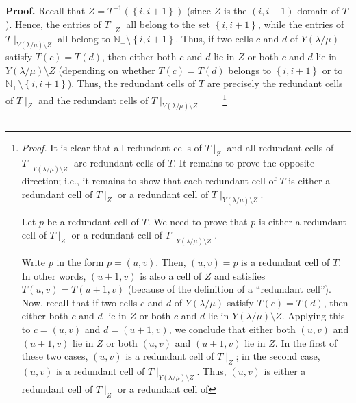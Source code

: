 \documentclass[numbers=enddot,12pt,final,onecolumn,notitlepage]{scrartcl}%
\theoremstyle{definition}
\newenvironment{proof}[1][Proof]{\noindent\textbf{#1.} }{\ \rule{0.5em}{0.5em}}
\newenvironment{verlong}{}{}
\begin{document}
\begin{verlong}
\begin{proof}
Recall that $Z=T^{-1}\left(  \left\{  i,i+1\right\}  \right)  $ (since $Z$ is
the $\left(  i,i+1\right)  $-domain of $T$). Hence, the entries of $T\mid_{Z}$
all belong to the set $\left\{  i,i+1\right\}  $, while the entries of
$T\mid_{Y\left(  \lambda/\mu\right)  \setminus Z}$ all belong to
$\mathbb{N}_{+}\setminus\left\{  i,i+1\right\}  $. Thus, if two cells $c$ and
$d$ of $Y\left(  \lambda/\mu\right)  $ satisfy $T\left(  c\right)  =T\left(
d\right)  $, then either both $c$ and $d$ lie in $Z$ or both $c$ and $d$ lie
in $Y\left(  \lambda/\mu\right)  \setminus Z$ (depending on whether $T\left(
c\right)  =T\left(  d\right)  $ belongs to $\left\{  i,i+1\right\}  $ or to
$\mathbb{N}_{+}\setminus\left\{  i,i+1\right\}  $). Thus, the redundant cells
of $T$ are precisely the redundant cells of $T\mid_{Z}$ and the redundant cells
of $T\mid_{Y\left(  \lambda/\mu\right)  \setminus Z}$%
\ \ \ \ \footnote{\textit{Proof.} It is clear that all redundant cells of
$T\mid_{Z}$ and all redundant cells of $T\mid_{Y\left(  \lambda/\mu\right)
\setminus Z}$ are redundant cells of $T$. It remains to prove the opposite
direction; i.e., it remains to show that each redundant cell of $T$ is either a
redundant cell of $T\mid_{Z}$ or a redundant cell of $T\mid_{Y\left(
\lambda/\mu\right)  \setminus Z}$.
\par
Let $p$ be a redundant cell of $T$. We need to prove that $p$ is either a
redundant cell of $T\mid_{Z}$ or a redundant cell of $T\mid_{Y\left(
\lambda/\mu\right)  \setminus Z}$.
\par
Write $p$ in the form $p=\left(  u,v\right)  $. Then, $\left(  u,v\right)  =p$
is a redundant cell of $T$. In other words, $\left(  u+1,v\right)  $ is also a
cell of $Z$ and satisfies $T\left(  u,v\right)  =T\left(  u+1,v\right)  $
(because of the definition of a \textquotedblleft redundant
cell\textquotedblright). Now, recall that if two cells $c$ and $d$ of
$Y\left(  \lambda/\mu\right)  $ satisfy $T\left(  c\right)  =T\left(
d\right)  $, then either both $c$ and $d$ lie in $Z$ or both $c$ and $d$ lie
in $Y\left(  \lambda/\mu\right)  \setminus Z$. Applying this to $c=\left(
u,v\right)  $ and $d=\left(  u+1,v\right)  $, we conclude that either both
$\left(  u,v\right)  $ and $\left(  u+1,v\right)  $ lie in $Z$ or both
$\left(  u,v\right)  $ and $\left(  u+1,v\right)  $ lie in $Z$. In the first
of these two cases, $\left(  u,v\right)  $ is a redundant cell of $T\mid_{Z}$;
in the second case, $\left(  u,v\right)  $ is a redundant cell of
$T\mid_{Y\left(  \lambda/\mu\right)  \setminus Z}$. Thus, $\left(  u,v\right)
$ is either a redundant cell of $T\mid_{Z}$ or a redundant cell of
}
\end{proof}
\end{verlong}
\end{document}
